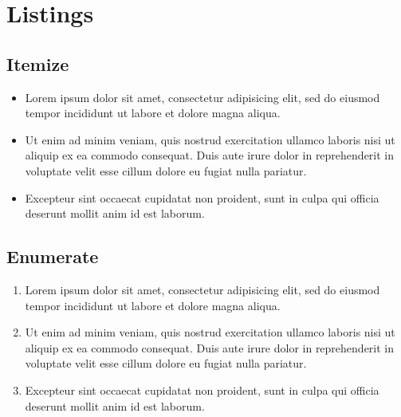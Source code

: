 \documentclass[jp]{nctam_proceeding}
\begin{document}
\section{Listings}
\subsection{Itemize}
\begin{itemize}
   \item Lorem ipsum dolor sit amet, consectetur adipisicing elit, sed do eiusmod
   tempor incididunt ut labore et dolore magna aliqua.\cite{AbedonHymanThomas2003}
   \item Ut enim ad minim veniam,
   quis nostrud exercitation ullamco laboris nisi ut aliquip ex ea commodo
   consequat. Duis aute irure dolor in reprehenderit in voluptate velit esse
   cillum dolore eu fugiat nulla pariatur.
   \item Excepteur sint occaecat cupidatat non
   proident, sunt in culpa qui officia deserunt mollit anim id est laborum.
\end{itemize}

\subsection{Enumerate}
\begin{enumerate}
   \item Lorem ipsum dolor sit amet, consectetur adipisicing elit, sed do eiusmod
   tempor incididunt ut labore et dolore magna aliqua.
   \item Ut enim ad minim veniam,
   quis nostrud exercitation ullamco laboris nisi ut aliquip ex ea commodo
   consequat. Duis aute irure dolor in reprehenderit in voluptate velit esse
   cillum dolore eu fugiat nulla pariatur.
   \item Excepteur sint occaecat cupidatat non
   proident, sunt in culpa qui officia deserunt mollit anim id est laborum.\cite{website:fermentas-lambda}
\end{enumerate}



\end{document}
